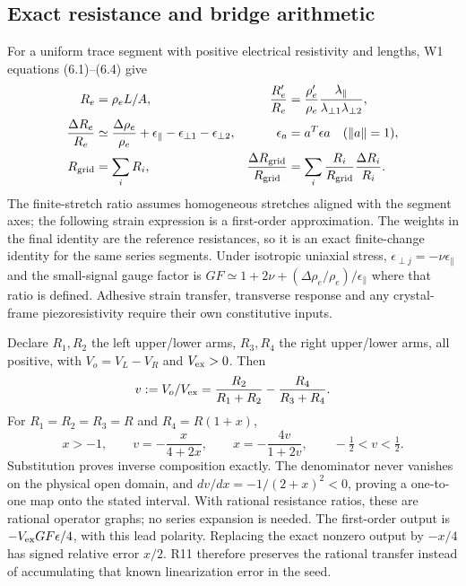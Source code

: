 \subsection{Exact resistance and bridge arithmetic}
For a uniform trace segment with positive electrical resistivity and lengths,
W1 equations (6.1)--(6.4) give
\begin{align}
 R_e&=\rho_eL/A, &\frac{R'_e}{R_e}
   &=\frac{\rho'_e}{\rho_e}\frac{\lambda_{\parallel}}
                                  {\lambda_{\perp1}\lambda_{\perp2}},\\
 \frac{\Delta R_e}{R_e}&\simeq\frac{\Delta\rho_e}{\rho_e}
   +\epsilon_{\parallel}-\epsilon_{\perp1}-\epsilon_{\perp2},
 &\epsilon_a&=a^T\epsilon a\quad(\|a\|=1),\\
 R_{\rm grid}&=\sum_iR_i,
 &\frac{\Delta R_{\rm grid}}{R_{\rm grid}}
    &=\sum_i\frac{R_i}{R_{\rm grid}}\frac{\Delta R_i}{R_i}.
\end{align}
The finite-stretch ratio assumes homogeneous stretches aligned with the
segment axes; the following strain expression is a first-order approximation.
The weights in the final identity are the reference resistances, so it is
an exact finite-change identity for the same series segments. Under isotropic
uniaxial stress, $\epsilon_{\perp j}=-\nu\epsilon_{\parallel}$ and the
small-signal gauge factor is
$GF\simeq1+2\nu+(\Delta\rho_e/\rho_e)/\epsilon_{\parallel}$ where that
ratio is defined. Adhesive strain transfer, transverse response and any
crystal-frame piezoresistivity require their own constitutive inputs.

Declare $R_1,R_2$ the left upper/lower arms, $R_3,R_4$ the right upper/lower
arms, all positive, with $V_o=V_L-V_R$ and $V_{\rm ex}>0$. Then
\begin{equation}
 v:=V_o/V_{\rm ex}=\frac{R_2}{R_1+R_2}-\frac{R_4}{R_3+R_4}.
 \label{eq:want-bridge}
\end{equation}
For $R_1=R_2=R_3=R$ and $R_4=R(1+x)$,
\begin{equation}
 x>-1,\qquad v=-\frac{x}{4+2x},\qquad
 x=-\frac{4v}{1+2v},\qquad -\tfrac12<v<\tfrac12 .
 \label{eq:want-inverse}
\end{equation}
Substitution proves inverse composition exactly. The denominator never
vanishes on the physical open domain, and $dv/dx=-1/(2+x)^2<0$, proving a
one-to-one map onto the stated interval. With rational resistance ratios,
these are rational operator graphs; no series expansion is needed.
The first-order output is $-V_{\rm ex}GF\epsilon/4$, with this lead polarity.
Replacing the exact nonzero output by $-x/4$ has signed relative error $x/2$.
R11 therefore preserves the rational transfer instead of accumulating that
known linearization error in the seed.


